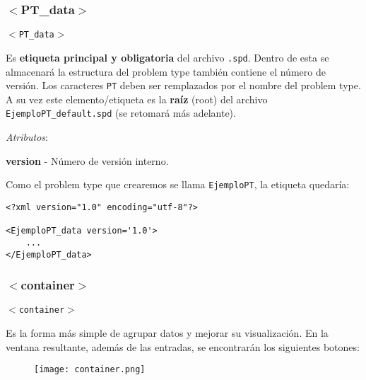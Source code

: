 \documentclass[10pt, a4paper, twocolumn]{article}
\begin{document}
\subsubsection{$<$PT\_data$>$}

\vspace{0.20cm}
\begin{center}
	\texttt{$<$PT\_data$>$}
\end{center}
\vspace{0.20cm}

Es \textbf{etiqueta principal y obligatoria} del archivo \texttt{.spd}. Dentro de esta se almacenará la estructura del problem type también contiene el número de versión. Los caracteres \texttt{PT} deben ser remplazados por el nombre del problem type. A su vez este elemento/etiqueta es la \textbf{raíz} (root) del archivo \texttt{EjemploPT\_default.spd} (se retomará más adelante).

\vspace{0.15cm}
\textit{Atributos}:

\vspace{0.15cm}
	\textbf{version} - Número de versión interno.
\vspace{0.15cm}

Como el problem type que crearemos se llama \texttt{EjemploPT}, la etiqueta quedaría:

\lstset{language=XML} 
\begin{lstlisting}[caption={Etiqueta principal que contiene la estructura del PT.}]
<?xml version="1.0" encoding="utf-8"?>

<EjemploPT_data version='1.0'>
	...
</EjemploPT_data>
\end{lstlisting}

\subsubsection{$<$container$>$}

\vspace{0.20cm}
\begin{center}
	\texttt{$<$container$>$}
\end{center}
\vspace{0.20cm}


Es la forma más simple de agrupar datos y mejorar su visualización. En la ventana resultante, además de las entradas, se encontrarán los siguientes botones:

\begin{figure}[hbtp!]
	\centering
	\texttt{[image: container.png]}
\end{figure}
\end{document}
